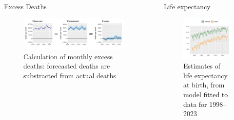\documentclass[final]{beamer}
\newlength{\sepwid}
\newlength{\onecolwid}
\newlength{\twocolwid}
\begin{document}
\begin{frame}[t]
\begin{columns}[t]
\begin{column}{\twocolwid}
\begin{alertblock}{Excess Deaths}
\begin{figure}
\includegraphics[width = \linewidth]{fig_calc_excess}
\caption{Calculation of monthly excess deaths: forecasted deaths are substracted from actual deaths}
\end{figure}

\end{alertblock} 

\end{column} %

\begin{column}{\sepwid}\end{column} %

\begin{column}{\onecolwid} %

\begin{block}{Life expectancy}
\begin{figure}
\includegraphics[width = 0.95\linewidth]{fig_lifeexp}
\caption{Estimates of life expectancy at birth, from model fitted to data for 1998--2023}
\end{figure}
\end{block}


\end{column}
\end{columns}
\end{frame}
\end{document}
